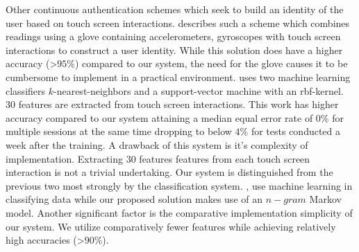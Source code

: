 Other continuous authentication schemes 
which seek to build an identity of the user based on
touch screen interactions.
%
\cite{feng2012continuous} describes such a scheme which combines readings
using a glove containing accelerometers, gyroscopes 
with touch screen interactions 
to construct a user identity.
While this solution does have 
a higher accuracy (\textgreater$95\%$)
compared to our system,
the need for the glove causes it
to be cumbersome to implement in a practical environment.
%
\cite{frank2013touchalytics} uses two machine learning
classifiers $k$-nearest-neighbors and 
a support-vector machine with an rbf-kernel.
$30$ features are extracted from touch screen interactions.
%
This work has higher accuracy compared to our system
attaining a median equal error rate of $0\%$
for multiple sessions at the same time dropping to below $4\%$
for tests conducted a week after the training.
%
A drawback of this system is it's complexity of implementation.
Extracting $30$ features features from each touch screen 
interaction is not a trivial undertaking.
%
Our system is distinguished from the previous two
most strongly by the classification system.
\cite{feng2012continuous}, \cite{frank2013touchalytics}
use machine learning in classifying data
while our proposed solution makes use of an $n-gram$ Markov model.
%
Another significant factor is the comparative implementation simplicity of our system.
We utilize comparatively fewer features 
while achieving relatively high accuracies (\textgreater$90\%$).
